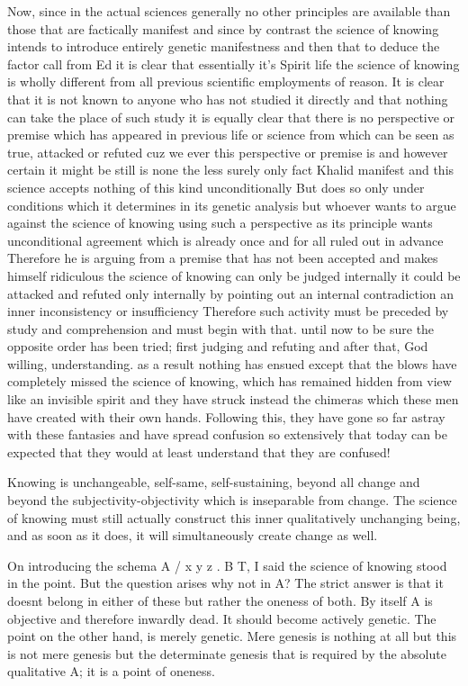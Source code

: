 \documentclass{article}
\begin{document}
Now, since in the actual sciences generally
no other principles are available
than those that are factically manifest
and since by contrast the science of knowing
intends to introduce entirely genetic manifestness
and then that to deduce the factor call from Ed 
it is clear that essentially it's Spirit life
the science of knowing is wholly different from 
all previous scientific employments of reason.
It is clear that it is not known to anyone who has not studied it directly
and that nothing can take the place of such study
it is equally clear that there is no perspective or premise
which has appeared in previous life or science from which can be seen as true,
attacked or refuted cuz we ever this perspective or premise is 
and however certain it might be still 
is none the less surely only fact Khalid manifest 
and this science accepts nothing of this kind unconditionally
But does so only under conditions which it determines 
in its genetic analysis
but whoever wants to argue against the science of knowing
using such a perspective as its principle wants unconditional agreement
which is already once and for all ruled out in advance
Therefore he is arguing from a premise that has not been accepted
and makes himself ridiculous
the science of knowing can only be judged internally 
it could be attacked and refuted only internally 
by pointing out an internal contradiction an inner inconsistency or insufficiency
Therefore such activity must be preceded by study and comprehension 
and must begin with that.
until now to be sure the opposite order has been tried;
first judging and refuting and after that, God willing, understanding.
as a result nothing has ensued except that the blows 
have completely missed the science of knowing, 
which has remained hidden from view like an invisible spirit 
and they have struck instead the chimeras
which these men have created with their own hands.
Following this, they have gone so far astray with these fantasies 
and have spread confusion so extensively that today can be expected
that they would at least understand that they are confused!

Knowing is unchangeable, self-same, self-sustaining,
beyond all change and beyond the subjectivity-objectivity
which is inseparable from change.
The science of knowing must still actually construct
this inner qualitatively unchanging being,
and as soon as it does, it will simultaneously create change as well.

On introducing the schema A / x y z . B T,
I said the science of knowing stood in the point.
But the question arises why not in A? The strict answer is that
it doesnt belong in either of these but rather the oneness of both.
By itself A is objective and therefore inwardly dead.
It should become actively genetic.
The point on the other hand, is merely genetic.
Mere genesis is nothing at all but this is not mere genesis
but the determinate genesis that is required by the absolute qualitative A;
it is a point of oneness.
\end{document}
